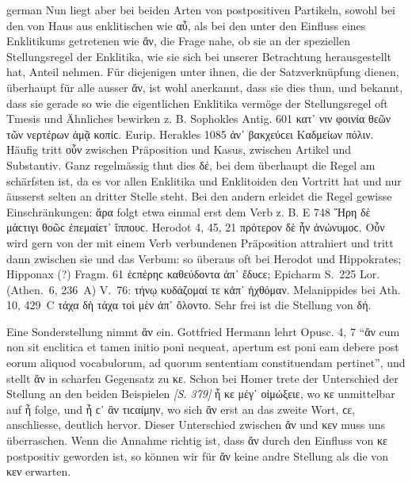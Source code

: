 \begin{otherlanguage*}{german}
Nun liegt aber bei beiden Arten von postpositiven Partikeln, sowohl bei den von Haus aus enklitischen wie αὖ, als bei den unter den Einfluss eines Enklitikums getretenen wie ἄν, die Frage nahe, ob sie an der speziellen Stellungsregel der Enklitika, wie sie sich bei unserer Betrachtung herausgestellt hat, Anteil nehmen. Für diejenigen unter ihnen, die der Satzverknüpfung dienen, überhaupt für alle ausser ἄν, ist wohl anerkannt, dass sie dies thun, und bekannt, dass sie gerade so wie die eigentlichen Enklitika vermöge der Stellungsregel oft Tmesis und Ähnliches bewirken z. B. Sophokles Antig. 601 κατ᾽  νιν φοινία θεῶν τῶν νερτέρων ἀμᾷ κοπίϲ. Eurip. Herakles 1085 ἀν᾽  βακχεύϲει Καδμείων πόλιν. Häufig tritt οὖν zwischen Präposition und Kasus, zwischen Artikel und Substantiv. Ganz regelmässig thut dies δέ, bei dem überhaupt die Regel am schärfsten ist, da es vor allen Enklitika und Enklitoiden den Vortritt hat und nur äusserst selten an dritter Stelle steht. Bei den andern erleidet die Regel gewisse Einschränkungen: ἄρα folgt etwa einmal erst dem Verb z. B. Ε 748 Ἥρη δὲ μάϲτιγι θοῶϲ ἐπεμαίετ᾽  ἵππουϲ. Herodot 4, 45, 21 πρότερον δὲ ἦν  ἀνώνυμοϲ. Οὖν wird gern von der mit einem Verb verbundenen Präposition attrahiert und tritt dann zwischen sie und das Verbum: so überaus oft bei Herodot und Hippokrates; Hipponax (?) Fragm. 61 ἑϲπέρηϲ καθεύδοντα ἀπ᾽  ἔδυϲε; Epicharm S.~225 Lor. (Athen.~6, 236~A) V.~76: τήνῳ κυδάζομαί τε κἀπ᾽  ἠχθόμαν. Melanippides bei Ath. 10, 429~C τάχα δὴ τάχα τοὶ μὲν ἀπ᾽  ὄλοντο. Sehr frei ist die Stellung von δή.

Eine Sonderstellung nimmt ἄν ein. Gottfried Hermann lehrt Opusc. 4, 7 “ἄν cum non sit enclitica et tamen initio poni nequeat, apertum est poni eam debere post eorum aliquod vocabulorum, ad quorum sententiam constituendam pertinet”, und stellt ἄν in scharfen Gegensatz zu κε. Schon bei Homer trete der Unterschied der Stellung an den beiden Beispielen \hypertarget{p379}{\emph{[S. 379]}}\label{p379} ἦ κε μέγ᾽ οἰμώξειε, wo κε unmittelbar auf ἦ folge, und ἦ ϲ᾽ ἂν τιϲαίμην, wo sich ἄν erst an das zweite Wort, ϲε, anschliesse, deutlich hervor. Dieser Unterschied zwischen ἄν und κεν muss uns überraschen. Wenn die Annahme richtig ist, dass ἄν durch den Einfluss von κε postpositiv geworden ist, so können wir für ἄν keine andre Stellung als die von κεν erwarten.


\end{otherlanguage*}
